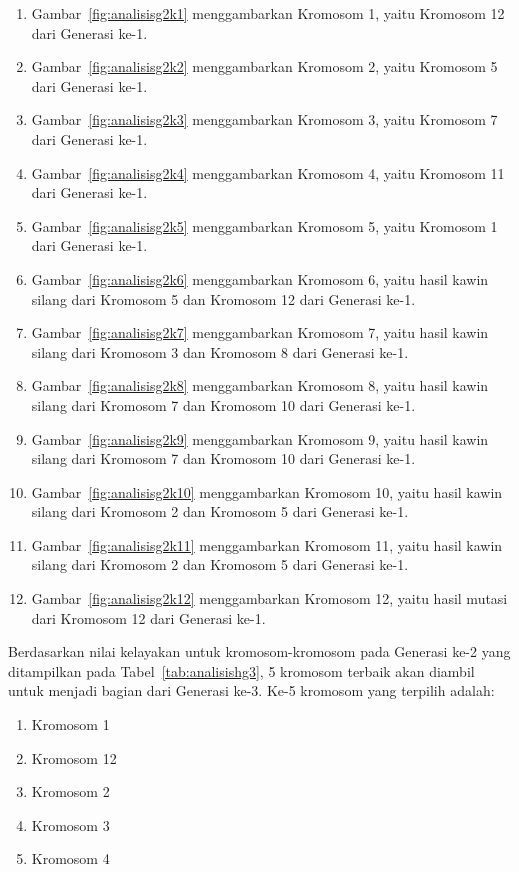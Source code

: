 \begin{enumerate}
\item Gambar~\ref{fig:analisisg2k1} menggambarkan Kromosom 1, yaitu Kromosom 12 dari Generasi ke-1.
\item Gambar~\ref{fig:analisisg2k2} menggambarkan Kromosom 2, yaitu Kromosom 5 dari Generasi ke-1.
\item Gambar~\ref{fig:analisisg2k3} menggambarkan Kromosom 3, yaitu Kromosom 7 dari Generasi ke-1.
\item Gambar~\ref{fig:analisisg2k4} menggambarkan Kromosom 4, yaitu Kromosom 11 dari Generasi ke-1.
\item Gambar~\ref{fig:analisisg2k5} menggambarkan Kromosom 5, yaitu Kromosom 1 dari Generasi ke-1.
\item Gambar~\ref{fig:analisisg2k6} menggambarkan Kromosom 6, yaitu hasil kawin silang dari Kromosom 5 dan Kromosom 12 dari Generasi ke-1.
\item Gambar~\ref{fig:analisisg2k7} menggambarkan Kromosom 7, yaitu hasil kawin silang dari Kromosom 3 dan Kromosom 8 dari Generasi ke-1.
\item Gambar~\ref{fig:analisisg2k8} menggambarkan Kromosom 8, yaitu hasil kawin silang dari Kromosom 7 dan Kromosom 10 dari Generasi ke-1.
\item Gambar~\ref{fig:analisisg2k9} menggambarkan Kromosom 9, yaitu hasil kawin silang dari Kromosom 7 dan Kromosom 10 dari Generasi ke-1.
\item Gambar~\ref{fig:analisisg2k10} menggambarkan Kromosom 10, yaitu hasil kawin silang dari Kromosom 2 dan Kromosom 5 dari Generasi ke-1.
\item Gambar~\ref{fig:analisisg2k11} menggambarkan Kromosom 11, yaitu hasil kawin silang dari Kromosom 2 dan Kromosom 5 dari Generasi ke-1.
\item Gambar~\ref{fig:analisisg2k12} menggambarkan Kromosom 12, yaitu hasil mutasi dari Kromosom 12 dari Generasi ke-1.
\end{enumerate}

\clearpage

Berdasarkan nilai kelayakan untuk kromosom-kromosom pada Generasi ke-2 yang ditampilkan pada Tabel~\ref{tab:analisishg3}, 5 kromosom terbaik akan diambil untuk menjadi bagian dari Generasi ke-3. Ke-5 kromosom yang terpilih adalah:
\begin{enumerate}
\item Kromosom 1
\item Kromosom 12
\item Kromosom 2
\item Kromosom 3
\item Kromosom 4
\end{enumerate}

